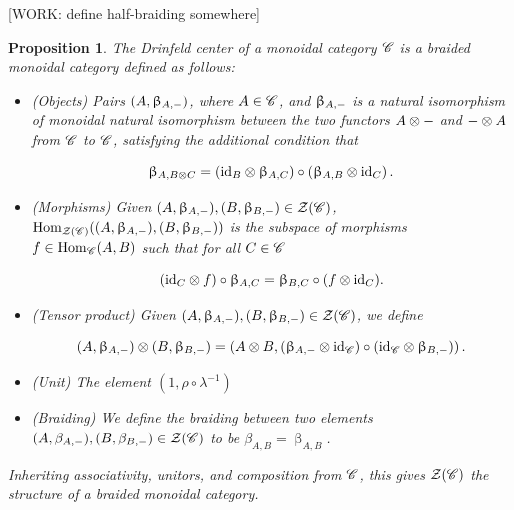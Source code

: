 \documentclass{article}
\newtheorem{proposition}{Proposition}[section]
\theoremstyle{definition}
\numberwithin{figure}{section}
\begin{document}
[WORK: define half-braiding somewhere]

\begin{proposition} The Drinfeld center of a monoidal category $\mathscr{C}$ is a braided monoidal category defined as follows:

\begin{itemize}
\item (Objects) Pairs $(A,\upbeta_{A,\--})$, where $A\in \mathscr{C}$, and $\upbeta_{A,\--}$ is a natural isomorphism of monoidal natural isomorphism between the two functors $A\otimes \--$ and $\--\otimes A$ from $\mathscr{C}$ to $\mathscr{C}$, satisfying the additional condition that

$$\upbeta_{A,B\otimes C}=\left(\mathrm{id}_{B}\otimes \upbeta_{A,C}\right)\circ \left(\upbeta_{A,B}\otimes \mathrm{id}_C\right).$$

\item (Morphisms) Given $(A,\upbeta_{A,\--}), (B,\upbeta_{B,\--})\in \mathcal{Z}(\mathscr{C})$, $\mathrm{Hom}_{\mathcal{Z}(\mathscr{C})}((A,\upbeta_{A,\--}),(B,\upbeta_{B,\--}))$ is the subspace of morphisms $f\in \mathrm{Hom}_{\mathscr{C}}(A,B)$ such that for all $C\in \mathscr{C}$

$$\left(\mathrm{id}_{C}\otimes f\right)\circ \upbeta_{A,C}=\upbeta_{B,C}\circ (f\otimes \mathrm{id}_C).$$

\item (Tensor product) Given $(A,\upbeta_{A,\--}), (B,\upbeta_{B,\--})\in \mathcal{Z}(\mathscr{C})$, we define

$$(A,\upbeta_{A,\--})\otimes (B,\upbeta_{B,\--})=\left(A\otimes B, (\upbeta_{A,\--}\otimes \mathrm{id}_{\mathscr{C}})\circ (\mathrm{id}_{\mathscr{C}}\otimes \upbeta_{B,\--}) \right).$$

\item (Unit) The element $(1,\rho\circ \lambda^{-1})$

\item (Braiding) We define the braiding between two elements $(A,\beta_{A,\--}), (B,\beta_{B,\--})\in \mathcal{Z}(\mathscr{C})$ to be $\beta_{A,B}=\upbeta_{A,B}$.
\end{itemize}

Inheriting associativity, unitors, and composition from $\mathscr{C}$, this gives $\mathcal{Z}(\mathscr{C})$ the structure of a braided monoidal category.
\end{proposition}
\end{document}
